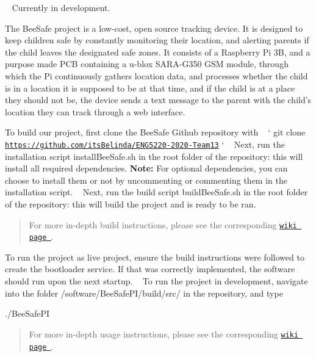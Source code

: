 \href{https://travis-ci.com/itsBelinda/ENG5220-2020-Team13}{\tt } \href{https://codecov.io/gh/itsBelinda/ENG5220-2020-Team13}{\tt } ~\newline
Currently in development.

The Bee\+Safe project is a low-\/cost, open source tracking device. It is designed to keep children safe by constantly monitoring their location, and alerting parents if the child leaves the designated safe zones. It consists of a Raspberry Pi 3B, and a purpose made P\+CB containing a u-\/blox S\+A\+R\+A-\/\+G350 G\+SM module, through which the Pi continuously gathers location data, and processes whether the child is in a location it is supposed to be at that time, and if the child is at a place they should not be, the device sends a text message to the parent with the child’s location they can track through a web interface.

To build our project, first clone the Bee\+Safe Github repository with ~\newline
 ` git clone \href{https://github.com/itsBelinda/ENG5220-2020-Team13}{\tt https\+://github.\+com/its\+Belinda/\+E\+N\+G5220-\/2020-\/\+Team13} ` ~\newline
 Next, run the installation script {\ttfamily install\+Bee\+Safe.\+sh} in the root folder of the repository\+: this will install all required dependencies. {\bfseries Note\+:} For optional dependencies, you can choose to install them or not by uncommenting or commenting them in the installation script. ~\newline
 Next, run the build script {\ttfamily build\+Bee\+Safe.\+sh} in the root folder of the repository\+: this will build the project and is ready to be ran. \begin{quote}
For more in-\/depth build instructions, please see the corresponding \href{https://github.com/itsBelinda/ENG5220-2020-Team13/wiki/Build-Guide}{\tt wiki page }. \end{quote}


To run the project as live project, ensure the build instructions were followed to create the bootloader service. If that was correctly implemented, the software should run upon the next startup. ~\newline
 To run the project in development, navigate into the folder {\ttfamily /software/\+Bee\+Safe\+P\+I/build/src/} in the repository, and type 
\begin{DoxyCode}
./BeeSafePI
\end{DoxyCode}
 \begin{quote}
For more in-\/depth usage instructions, please see the corresponding \href{https://github.com/itsBelinda/ENG5220-2020-Team13/wiki/User-Guide}{\tt wiki page }. \end{quote}


